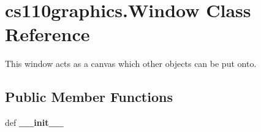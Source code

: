 \hypertarget{classcs110graphics_1_1Window}{
\section{cs110graphics.Window Class Reference}
\label{classcs110graphics_1_1Window}
}


This window acts as a canvas which other objects can be put onto.  
\subsection*{Public Member Functions}
\begin{DoxyCompactItemize}
\item 
\hypertarget{classcs110graphics_1_1Window_af926549e3d731847886302fa390f2863}{
def {\bfseries \_\-\_\-init\_\-\_\-}}
\label{classcs110graphics_1_1Window_af926549e3d731847886302fa390f2863}


\end{DoxyCompactItemize}
